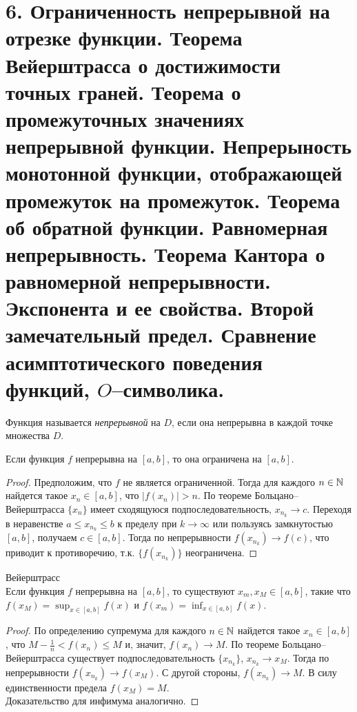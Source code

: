 \section{6. Ограниченность непрерывной на отрезке функции. Теорема Вейерштрасса о достижимости точных граней. Теорема о промежуточных значениях непрерывной функции. Непрерыность монотонной функции, отображающей промежуток на промежуток. Теорема об обратной функции. Равномерная непрерывность. Теорема Кантора о равномерной непрерывности. Экспонента и ее свойства. Второй замечательный предел. Сравнение асимптотического поведения функций, $O$--символика.}

    \begin{definition}
        Функция называется \textit{непрерывной} на $D$, если она непрерывна в каждой точке множества $D$.
    \end{definition}

    \begin{lemma}
        Если функция $f$ непрерывна на $[a, b]$, то она ограничена на $[a, b]$.
    \end{lemma}

    \begin{proof}
        Предположим, что $f$ не является ограниченной. Тогда для каждого $n \in \mathbb{N}$ найдется такое $x_{n} \in [a, b]$, что $|f(x_{n})| > n$. По теореме Больцано--Вейерштрасса $\{x_{n}\}$ имеет сходящуюся подпоследовательность, $x_{n_{k}} \to c$. Переходя в неравенстве $a \leq x_{n_{k}} \leq b$ к пределу при $k \to \infty$ или пользуясь замкнутостью $[a, b]$, получаем $c \in [a, b]$. Тогда по непрерывности $f(x_{n_{k}}) \to f(c)$, что приводит к противоречию, т.к. $\{f(x_{n_{k}})\}$ неограничена.
    \end{proof}

    \begin{theorem}{Вейерштрасс}\\
        Если функция $f$ непрерывна на $[a, b]$, то существуют $x_{m}, x_{M} \in [a, b]$, такие что $f(x_{M}) = \sup_{x \in [a, b]} f(x)$ и $f(x_{m}) = \inf_{x \in [a, b]} f(x)$.
    \end{theorem}

    \begin{proof}
        По определению супремума для каждого $n \in \mathbb{N}$ найдется такое $x_{n} \in [a, b]$, что $M - \frac{1}{n} < f(x_{n}) \leq M$ и, значит, $f(x_{n}) \to M$. По теореме Больцано--Вейерштрасса существует подпоследовательность $\{x_{n_{k}}\}$, $x_{n_{k}} \to x_{M}$. Тогда по непрерывности $f(x_{n_{k}}) \to f(x_{M})$. С другой стороны, $f(x_{n_{k}}) \to M$. В силу единственности предела $f(x_{M}) = M$.\\
        Доказательство для инфимума аналогично.
    \end{proof}

